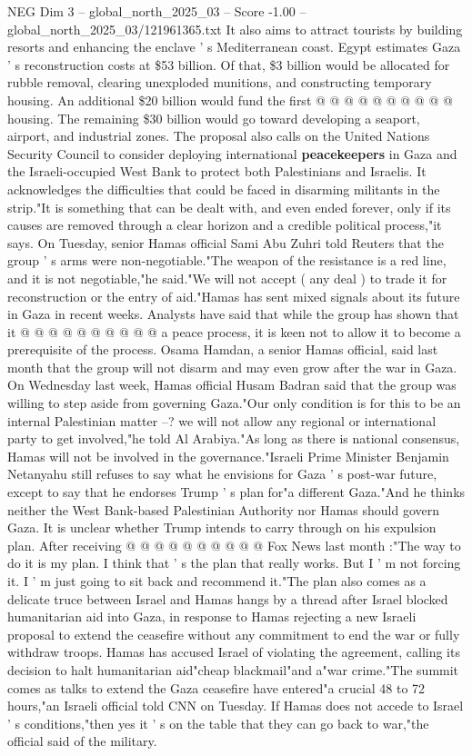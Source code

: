 \begin{textsample}{NEG Dim 3 – global\_north\_2025\_03 – Score -1.00 – global\_north\_2025\_03/121961365.txt}
It also aims to attract tourists by building resorts and enhancing the enclave ' s Mediterranean coast.
Egypt estimates Gaza ' s reconstruction costs at \$53 billion.
Of that, \$3 billion would be allocated for rubble removal, clearing unexploded munitions, and constructing temporary housing.
An additional \$20 billion would fund the first @ @ @ @ @ @ @ @ @ @ housing.
The remaining \$30 billion would go toward developing a seaport, airport, and industrial zones.
The proposal also calls on the United Nations Security Council to consider deploying international \textbf{peacekeepers} in Gaza and the Israeli-occupied West Bank to protect both Palestinians and Israelis.
It acknowledges the difficulties that could be faced in disarming militants in the strip."It is something that can be dealt with, and even ended forever, only if its causes are removed through a clear horizon and a credible political process,"it says.
On Tuesday, senior Hamas official Sami Abu Zuhri told Reuters that the group ' s arms were non-negotiable."The weapon of the resistance is a red line, and it is not negotiable,"he said."We will not accept ( any deal ) to trade it for reconstruction or the entry of aid."Hamas has sent mixed signals about its future in Gaza in recent weeks.
Analysts have said that while the group has shown that it @ @ @ @ @ @ @ @ @ @ a peace process, it is keen not to allow it to become a prerequisite of the process.
Osama Hamdan, a senior Hamas official, said last month that the group will not disarm and may even grow after the war in Gaza.
On Wednesday last week, Hamas official Husam Badran said that the group was willing to step aside from governing Gaza."Our only condition is for this to be an internal Palestinian matter --? we will not allow any regional or international party to get involved,"he told Al Arabiya."As long as there is national consensus, Hamas will not be involved in the governance."Israeli Prime Minister Benjamin Netanyahu still refuses to say what he envisions for Gaza ' s post-war future, except to say that he endorses Trump ' s plan for"a different Gaza."And he thinks neither the West Bank-based Palestinian Authority nor Hamas should govern Gaza.
It is unclear whether Trump intends to carry through on his expulsion plan.
After receiving @ @ @ @ @ @ @ @ @ @ Fox News last month :"The way to do it is my plan.
I think that ' s the plan that really works.
But I ' m not forcing it.
I ' m just going to sit back and recommend it."The plan also comes as a delicate truce between Israel and Hamas hangs by a thread after Israel blocked humanitarian aid into Gaza, in response to Hamas rejecting a new Israeli proposal to extend the ceasefire without any commitment to end the war or fully withdraw troops.
Hamas has accused Israel of violating the agreement, calling its decision to halt humanitarian aid"cheap blackmail"and a"war crime."The summit comes as talks to extend the Gaza ceasefire have entered"a crucial 48 to 72 hours,"an Israeli official told CNN on Tuesday.
If Hamas does not accede to Israel ' s conditions,"then yes it ' s on the table that they can go back to war,"the official said of the military.

\end{textsample}

